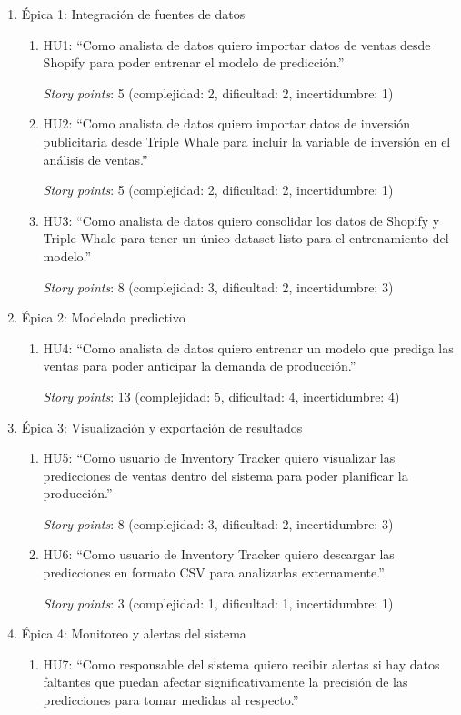 \documentclass[
11pt, %
]{charter}
\begin{document}
\begin{enumerate}
	\item Épica 1: Integración de fuentes de datos
	\begin{enumerate}
		\item HU1: “Como analista de datos quiero importar datos de ventas desde Shopify para poder entrenar el modelo de predicción.”

		\textit{Story points}: 5 (complejidad: 2, dificultad: 2, incertidumbre: 1)

		\item HU2: “Como analista de datos quiero importar datos de inversión publicitaria desde Triple Whale para incluir la variable de inversión en el análisis de ventas.”

		\textit{Story points}: 5 (complejidad: 2, dificultad: 2, incertidumbre: 1)

		\item HU3: “Como analista de datos quiero consolidar los datos de Shopify y Triple Whale para tener un único dataset listo para el entrenamiento del modelo.”

		\textit{Story points}: 8 (complejidad: 3, dificultad: 2, incertidumbre: 3)
	\end{enumerate}
	\item Épica 2: Modelado predictivo
	\begin{enumerate}
		\item HU4: “Como analista de datos quiero entrenar un modelo que prediga las ventas para poder anticipar la demanda de producción.”

		\textit{Story points}: 13 (complejidad: 5, dificultad: 4, incertidumbre: 4)
	\end{enumerate}
	\item Épica 3: Visualización y exportación de resultados
	\begin{enumerate}
		\item HU5: “Como usuario de Inventory Tracker quiero visualizar las predicciones de ventas dentro del sistema para poder planificar la producción.”

		\textit{Story points}: 8 (complejidad: 3, dificultad: 2, incertidumbre: 3)

		\item HU6: “Como usuario de Inventory Tracker quiero descargar las predicciones en formato CSV para analizarlas externamente.”

		\textit{Story points}: 3 (complejidad: 1, dificultad: 1, incertidumbre: 1)

	\end{enumerate}
	\item Épica 4: Monitoreo y alertas del sistema
	\begin{enumerate}
		\item HU7: “Como responsable del sistema quiero recibir alertas si hay datos faltantes que puedan afectar significativamente la precisión de las predicciones para tomar medidas al respecto.”


\end{enumerate}
\end{enumerate}
\end{document}
